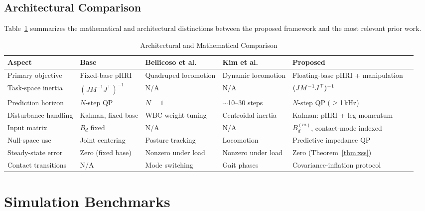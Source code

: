 \subsection{Architectural Comparison}\label{sec:comparison}

Table~\ref{tab:comparison} summarizes the mathematical and architectural
distinctions between the proposed framework and the most relevant prior
work.

\begin{table}[!t]
\caption{Architectural and Mathematical Comparison}
\label{tab:comparison}
\renewcommand{\arraystretch}{1.3}
\begin{tabular*}{\textwidth}{@{\extracolsep{\fill}}llllll}
\toprule
\textbf{Aspect} & \textbf{Base \cite{cao2026impedance}} & \textbf{Bellicoso et al.\ \cite{bellicoso2016perception}} & \textbf{Kim et al.\ \cite{kim2019highly}} & \textbf{Proposed} \\
\midrule
Primary objective    & Fixed-base pHRI           & Quadruped locomotion  & Dynamic locomotion    & Floating-base pHRI + manipulation \\
Task-space inertia   & $(JM^{-1}J^\top)^{-1}$   & N/A                   & N/A                   & $(J\bar{M}^{-1} J^\top)^{-1}$ \\
Prediction horizon   & $N$-step QP               & $N=1$                 & $\sim$10--30 steps    & $N$-step QP (${\geq}$1\,kHz) \\
Disturbance handling & Kalman, fixed base        & WBC weight tuning     & Centroidal inertia    & Kalman: pHRI + leg momentum \\
Input matrix         & $B_d$ fixed               & N/A                   & N/A                   & $B_d^{(m)}$, contact-mode indexed \\
Null-space use       & Joint centering           & Posture tracking      & Locomotion            & Predictive impedance QP \\
Steady-state error   & Zero (fixed base)         & Nonzero under load    & Nonzero under load    & Zero (Theorem~\ref{thm:zss}) \\
Contact transitions  & N/A                       & Mode switching        & Gait phases           & Covariance-inflation protocol \\
\bottomrule
\end{tabular*}
\end{table}

\section{Simulation Benchmarks}\label{sec:simulation}

